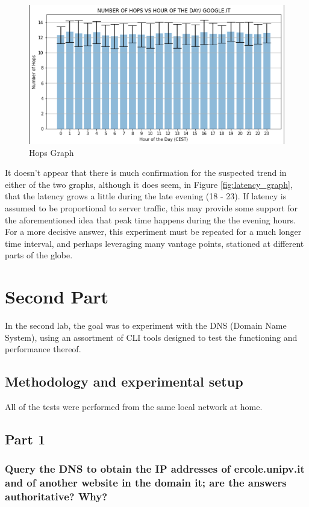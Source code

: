 \documentclass[a4paper,10pt]{article}
\begin{document}
\begin{figure}[h!]
\centering
\includegraphics[scale=0.4]{hops_graph}
\caption{Hops Graph}
\label{fig:hops_graph}
\end{figure}


It doesn't appear that there is much confirmation for the suspected trend in either of the  two graphs, although it does seem, in Figure \ref{fig:latency_graph}, that the latency grows a little during the late evening (18 - 23). If latency is assumed to be proportional to server traffic, this may provide some support for the aforementioned idea that peak time happens during the   the evening hours.\\

For a more decisive answer, this experiment must be repeated for a much longer time interval, and perhaps leveraging many vantage points, stationed at different parts of the globe.

\section{Second Part}
In the second lab, the goal was to experiment with the DNS (Domain Name System), using an assortment of CLI tools designed to test the functioning and performance thereof.

\subsection{Methodology and experimental setup}
All of the tests were performed from the same local network at home.

\subsection{Part 1}

\subsubsection{Query the DNS to obtain the IP addresses of ercole.unipv.it and of another website in the domain it; are the answers authoritative? Why?}
\end{document}

